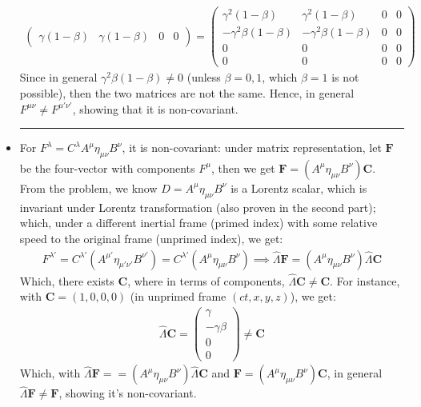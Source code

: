 \documentclass{article}
\begin{document}
\begin{itemize}
\begin{align}
\begin{pmatrix}
            \gamma(1-\beta) & \gamma(1-\beta)&0&0
        \end{pmatrix} = \begin{pmatrix}
            \gamma^2(1-\beta) & \gamma^2(1-\beta)&0&0\\
            -\gamma^2\beta(1-\beta) & -\gamma^2\beta(1-\beta)&0&0\\
            0&0&0&0\\0&0&0&0
        \end{pmatrix}
    \end{align}
    Since in general $\gamma^2\beta(1-\beta)\neq 0$ (unless $\beta=0,1$, which $\beta=1$ is not possible), then the two matrices are not the same. Hence, in general $F^{\mu\nu}\neq F^{\mu'\nu'}$, showing that it is non-covariant.

    \rule{15.6cm}{0,1mm}

    \item For $F^\lambda = C^\lambda A^\mu \eta_{\mu\nu}B^\nu$, it is non-covariant: under matrix representation, let $\textbf{F}$ be the four-vector with components $F^{\mu}$, then we get $\textbf{F} = (A^{\mu}\eta_{\mu\nu}B^{\nu})\textbf{C}$. From the problem, we know $D=A^\mu\eta_{\mu\nu}B^{\nu}$ is a Lorentz scalar, which is invariant under Lorentz transformation (also proven in the second part); which, under a different inertial frame (primed index) with some relative speed to the original frame (unprimed index), we get:
    \begin{align}
        F^{\lambda'} = C^{\lambda'}(A^{\mu'}\eta_{\mu'\nu'}B^{\nu'}) = C^{\lambda'}(A^\mu\eta_{\mu\nu}B^{\nu}) \implies \hat{\Lambda}\textbf{F} = (A^\mu\eta_{\mu\nu}B^\nu) \hat{\Lambda}\textbf{C}
    \end{align}
    Which, there exists $\textbf{C}$, where in terms of components, $\hat{\Lambda}\textbf{C}\neq \textbf{C}$. For instance, with $\textbf{C}=(1,0,0,0)$ (in unprimed frame $(ct,x,y,z)$), we get:
    \begin{align}
        \hat{\Lambda}\textbf{C} = \begin{pmatrix}
            \gamma\\-\gamma\beta\\0\\0
        \end{pmatrix} \neq \textbf{C}
    \end{align}
    Which, with $\hat{\Lambda}\textbf{F} = =(A^\mu\eta_{\mu\nu}B^\nu)\hat{\Lambda}\textbf{C}$ and $\textbf{F}=(A^\mu\eta_{\mu\nu}B^\nu)\textbf{C}$, in general $\hat{\Lambda}\textbf{F}\neq \textbf{F}$, showing it's non-covariant.


\end{itemize}
\end{document}

